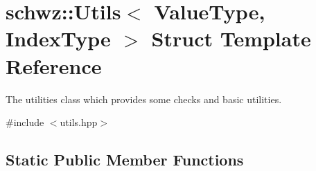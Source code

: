 \hypertarget{structschwz_1_1Utils}{}\section{schwz\+:\+:Utils$<$ Value\+Type, Index\+Type $>$ Struct Template Reference}
\label{structschwz_1_1Utils}


The utilities class which provides some checks and basic utilities.  




{\ttfamily \#include $<$utils.\+hpp$>$}

\subsection*{Static Public Member Functions}
